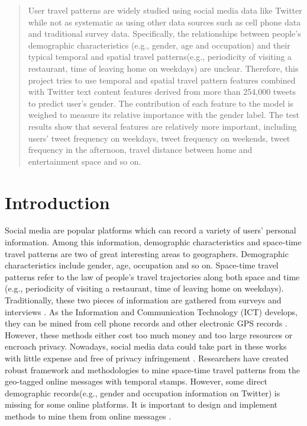 \documentclass{article}
\begin{document}
\printAffiliationsAndNotice{\icmlEqualContribution} %

\begin{abstract} 

User travel patterns are widely studied using social media data like Twitter while not as systematic as using other data sources such as cell phone data and traditional survey data. Specifically, the relationships between people's demographic characteristics (e.g., gender, age and occupation) and their typical temporal and spatial travel patterns(e.g., periodicity of visiting a restaurant, time of leaving home on weekdays) are unclear. Therefore, this project tries to use temporal and spatial travel pattern features combined with Twitter text content features derived from more than 254,000 tweets to predict user's gender. The contribution of each feature to the model is weighed to measure its relative importance with the gender label. The test results show that several features are relatively more important, including users' tweet frequency on weekdays, tweet frequency on weekends, tweet frequency in the afternoon, travel distance between home and entertainment space and so on. 

\end{abstract} 


\section{Introduction}

Social media are popular platforms which can record a variety of users' personal information. Among this information, demographic characteristics \cite{sloan2013knowing} and space-time travel patterns \cite{hasan2013understanding} are two of great interesting areas to geographers. Demographic characteristics include gender, age, occupation and so on. Space-time travel patterns refer to the law of people's travel trajectories along both space and time (e.g., periodicity of visiting a restaurant, time of leaving home on weekdays). Traditionally, these two pieces of information are gathered from surveys and interviews \cite{chen2011exploratory}. As the Information and Communication Technology (ICT) develops, they can be mined from cell phone records and other electronic GPS records \cite{sila2016analysis}. However, these methods either cost too much money and too large resources or encroach privacy. Nowadays, social media data could take part in these works with little expense and free of privacy infringement \cite{preoctiuc2013mining}. Researchers have created robust framework and methodologies to mine space-time travel patterns from the geo-tagged online messages with temporal stamps. However, some direct demographic records(e.g., gender and occupation information on Twitter) is missing for some online platforms. It is important to design and implement methods to mine them from online messages \cite{rao2011hierarchical}. 
\end{document}
